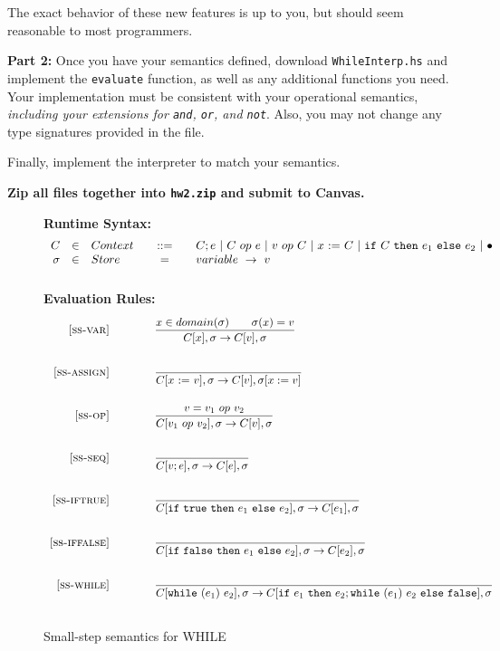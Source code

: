 \documentclass{article}
\begin{document}
The exact behavior of these new features is up to you,
but should seem reasonable to most programmers.

\bigskip
\noindent
{\bf Part 2:}
Once you have your semantics defined,
download {\tt WhileInterp.hs} and implement the {\tt evaluate} function,
as well as any additional functions you need.
Your implementation must be consistent with your operational semantics,
{\it including your extensions for {\tt and}, {\tt or}, and {\tt not}}.
Also, you may not change any type signatures provided in the file.

Finally, implement the interpreter to match your semantics.

\bigskip
\noindent
{\bf Zip all files together into {\tt hw2.zip} and submit to Canvas.}





\begin{figure}[H]\label{fig:smallstep}
\caption{Small-step semantics for WHILE}
{\bf Runtime Syntax:}
\[
\begin{array}{rclcl}
  C & \in & {Context} \quad & ::= & \quad C; e
        ~|~ C ~op~ e
        ~|~ v ~op~ C
        ~|~ x~{:=}~C
        ~|~ \mbox{\tt if}~{C}~\mbox{\tt then}~{e_1}~\mbox{\tt else}~{e_2}
        ~|~ \bullet \\
  \sigma & \in & {Store} \quad  & = & \quad {variable} ~\rightarrow ~v \\
  \\
\end{array}
\]
{\bf Evaluation Rules:~~~ } \\
\[
\begin{array}{r@{\qquad\qquad}l}
\ssrule{ss-var}{
  x \in domain(\sigma) \qquad \sigma(x)=v
}{
  \sstep{x}{\sigma}{v}{\sigma}
}
\ssrule{ss-assign}{
}{
  \sstep{\assign{x}{v}}{\sigma}{v}{\sigma[x:=v]}
}
\ssrule{ss-op}{
  v = v_1 ~op~ v_2
}{
  \sstep{v_1~op~v_2}{\sigma}{v}{\sigma}
}
\ssrule{ss-seq}{
}{
  \sstep{v;e}{\sigma}{e}{\sigma}
}
\ssrule{ss-iftrue}{
}{
  \sstep{\ife{\true}{e_1}{e_2}}{\sigma}{e_1}{\sigma}
}
\ssrule{ss-iffalse}{
}{
  \sstep{\ife{\false}{e_1}{e_2}}{\sigma}{e_2}{\sigma}
}
\ssrule{ss-while}{
}{
  \sstep{\whilee{e_1}{e_2}}{\sigma}{\ife{e_1}{e_2;\whilee{e_1}{e_2}}{\false}}{\sigma}
}
\end{array}
\]
\end{figure}
\end{document}

